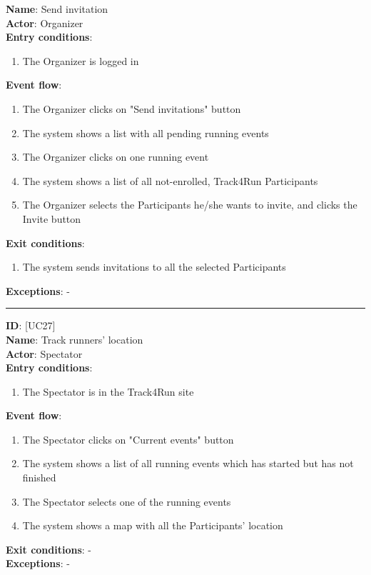 \documentclass[hidelinks, 12pt]{report}
\newcommand\usecase[1]{ [UC#1] }
\begin{document}
\begin{itemize}
		\textbf{Name}: Send invitation \\
		\textbf{Actor}: Organizer \\
		\textbf{Entry conditions}:
		\begin{enumerate}
			\item{The Organizer is logged in}
		\end{enumerate}
		\textbf{Event flow}:
		\begin{enumerate}
			\item{The Organizer clicks on "Send invitations" button}
			\item{The system shows a list with all pending running events}
			\item{The Organizer clicks on one running event}
			\item{The system shows a list of all not-enrolled, Track4Run Participants}
			\item{The Organizer selects the Participants he/she wants to invite, and clicks the Invite button}
		\end{enumerate}
		\textbf{Exit conditions}:
		\begin{enumerate}
			\item{The system sends invitations to all the selected Participants}
		\end{enumerate}
		\textbf{Exceptions}: - \\
		\rule{\linewidth}{0.4pt}
		\textbf{ID}: \usecase{27} \\
		\textbf{Name}: Track runners' location \\
		\textbf{Actor}: Spectator \\
		\textbf{Entry conditions}:
		\begin{enumerate}
			\item{The Spectator is in the Track4Run site}
		\end{enumerate}
		\textbf{Event flow}:
		\begin{enumerate}
			\item{The Spectator clicks on "Current events" button}
			\item{The system shows a list of all running events which has started but has not finished}
			\item{The Spectator selects one of the running events}
			\item{The system shows a map with all the Participants' location}
		\end{enumerate}
		\textbf{Exit conditions}: - \\
		\textbf{Exceptions}: - \\

\end{itemize}
\end{document}

